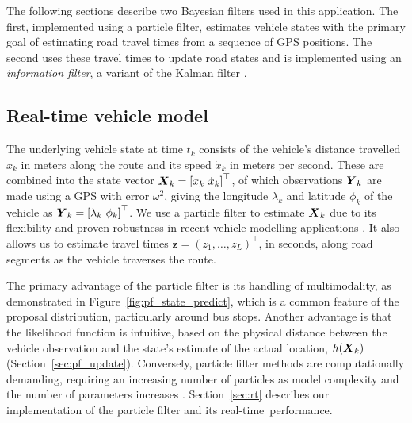 \documentclass[times, doublespace]{anzsauth}
\newcommand{\bz}{\boldsymbol{z}}
\newcommand{\rt}{real-time\ }
\begin{document}
The following sections describe two Bayesian filters used in this application.
The first, implemented using a particle filter, estimates vehicle states
with the primary goal of estimating road travel times from a sequence of GPS positions.
The second uses these travel times to update road states
and is implemented using an \emph{information filter},
a variant of the Kalman filter \citep{Anderson_2012}.



\subsection{Real-time vehicle model}
\label{sec:pf}

The underlying vehicle state at time $t_k$ consists of
the vehicle's distance travelled $x_k$ in meters along the route and
its speed $\dot x_k$ in meters per second.
These are combined into the state vector
$\mbox{$\boldsymbol{X}$}_k = \left[x_k\ \dot x_k\right]^\top$,
of which observations $\mbox{$\boldsymbol{Y}$}_k$ are made using a GPS
with error $\omega^2$,
giving the longitude $\lambda_k$ and latitude $\phi_k$ of the vehicle
as $\bY_k = \left[\lambda_k\ \phi_k \right]^\top$.
We use a particle filter to estimate $\mbox{$\boldsymbol{X}$}_k$
due to its flexibility and proven robustness
in recent vehicle modelling applications \citep{Ulmke_2006,Hans_2015}.
It also allows us to estimate travel times
$\bz = (z_1,\ldots,z_L)^\top$, in seconds, along road segments
as the vehicle traverses the route.


The primary advantage of the particle filter is its handling of multimodality,
as demonstrated in Figure~\ref{fig:pf_state_predict},
which is a common feature of the proposal distribution, particularly around bus stops.
Another advantage is that the likelihood function is intuitive, based
on the physical distance between the vehicle observation and the state's
estimate of the actual location, $h(\mbox{$\boldsymbol{X}$}_k)$ (Section~\ref{sec:pf_update}).
Conversely, particle filter methods are computationally demanding,
requiring an increasing number of particles as model complexity and
the number of parameters increases \citep{Carpenter_1999}.
Section~\ref{sec:rt} describes our implementation of the particle filter
and its \rt performance.
\end{document}
